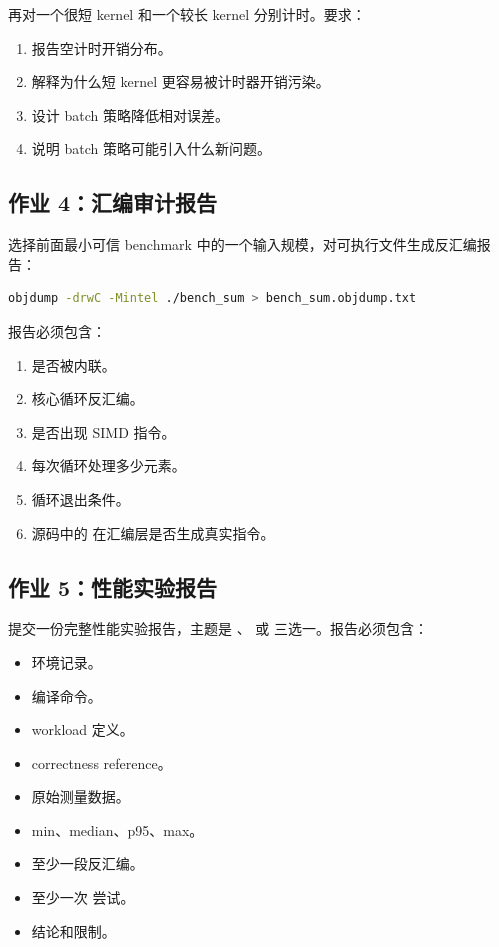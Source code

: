 \begin{exercisebox}
再对一个很短 kernel 和一个较长 kernel 分别计时。要求：

\begin{enumerate}
  \item 报告空计时开销分布。
  \item 解释为什么短 kernel 更容易被计时器开销污染。
  \item 设计 batch 策略降低相对误差。
  \item 说明 batch 策略可能引入什么新问题。
\end{enumerate}

\subsection*{作业 4：汇编审计报告}

选择前面最小可信 benchmark 中的一个输入规模，对可执行文件生成反汇编报告：

\begin{lstlisting}[language=bash]
objdump -drwC -Mintel ./bench_sum > bench_sum.objdump.txt
\end{lstlisting}

报告必须包含：

\begin{enumerate}
  \item {} 是否被内联。
  \item 核心循环反汇编。
  \item 是否出现 SIMD 指令。
  \item 每次循环处理多少元素。
  \item 循环退出条件。
  \item 源码中的  在汇编层是否生成真实指令。
\end{enumerate}

\subsection*{作业 5：性能实验报告}

提交一份完整性能实验报告，主题是 、 或  三选一。报告必须包含：

\begin{itemize}
  \item 环境记录。
  \item 编译命令。
  \item workload 定义。
  \item correctness reference。
  \item 原始测量数据。
  \item min、median、p95、max。
  \item 至少一段反汇编。
  \item 至少一次  尝试。
  \item 结论和限制。
\end{itemize}


\end{exercisebox}
